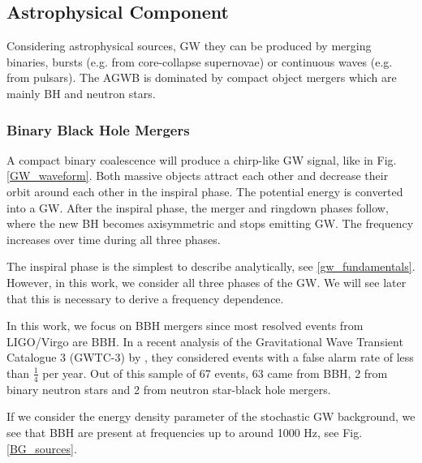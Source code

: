 \subsection{Astrophysical Component}
\label{astro_GWB}
Considering astrophysical sources, GW they can be produced by merging binaries, bursts (e.g. from core-collapse supernovae) or continuous waves 
(e.g. from pulsars). The AGWB is dominated by compact object mergers which are mainly BH and neutron stars. 


\subsubsection{Binary Black Hole Mergers}
\label{BBH_mergers}

A compact binary coalescence will produce a chirp-like GW signal, like in Fig. \ref{GW_waveform}. Both massive objects attract each other and decrease their orbit around each other in the inspiral phase. The potential energy is converted into a GW. After the inspiral phase, the merger and ringdown phases follow, where the new BH becomes axisymmetric and stops emitting GW. The frequency increases over time during all three phases.

The inspiral phase is the simplest to describe analytically, see \ref{gw_fundamentals}. However, in this work, we consider all three phases of the GW. We will see later that this is necessary to derive a frequency dependence.


In this work, we focus on BBH mergers since most resolved events from LIGO/Virgo are BBH. In a recent analysis of the Gravitational Wave Transient Catalogue 3 (GWTC-3) by \cite{the_ligo_scientific_collaboration_population_2022}, they considered events with a false alarm rate of less than $\frac{1}{4}$ per year. Out of this sample of 67 events, 63 came from BBH, 2 from binary neutron stars and 2 from neutron star-black hole mergers.

If we consider the energy density parameter of the stochastic GW background, we see that BBH are present at frequencies up to around 1000 Hz, see Fig. \ref{BG_sources}. 


